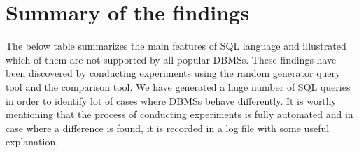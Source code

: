 \section{Summary of the findings}
 
The below table summarizes the main features of SQL language and illustrated which of them are not supported by all popular DBMSs. These findings have been discovered by conducting experiments using the random generator query tool and the comparison tool. We have generated a huge number of SQL queries in order to identify lot of cases where DBMSs behave differently. It is worthy mentioning that the process of conducting experiments is fully automated and in case where a difference is found, it is recorded in a log file with some useful explanation.    

\begin{table}[h]
\caption{My caption}
\label{my-label}
\end{table}
